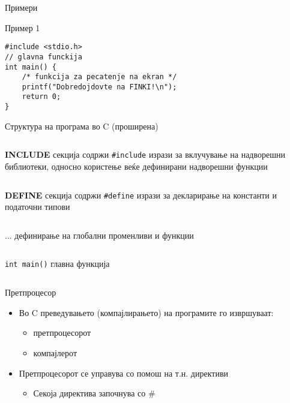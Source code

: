 \begin{frame}[fragile]{Примери}
    \begin{exampleblock}{Пример 1}
\begin{lstlisting}
#include <stdio.h>
// glavna funckija
int main() {
    /* funkcija za pecatenje na ekran */
    printf("Dobredojdovte na FINKI!\n");
    return 0;
}
\end{lstlisting}
    \end{exampleblock}
\end{frame}

\begin{frame}{Структура на програма во C (проширена)}
    \begin{columns}
        \textbf{INCLUDE} секција
         содржи \texttt{\#include} изрази за вклучување на надворешни библиотеки, односно користење веќе дефинирани надворешни функции
    \end{columns}
    \hfill
    \linebreak
    \begin{columns}
        \textbf{DEFINE} секција
         содржи \texttt{\#define} изрази за декларирање на константи и податочни типови
    \end{columns}   
    \hfill
    \linebreak
    \begin{columns}
        ...
         дефинирање на глобални променливи и функции
    \end{columns}
    \hfill
    \linebreak
    \begin{columns}
        \texttt{int main()}
         главна функција
    \end{columns}
\end{frame}

\begin{frame}{Претпроцесор}
\begin{itemize}
    \item Во C преведувањето (компајлирањето) на програмите го извршуваат:
    \begin{itemize}
        \item претпроцесорот
        \item компајлерот
    \end{itemize}
    \item Претпроцесорот се управува со помош на т.н. директиви
    \begin{itemize}
        \item Секоја директива започнува со \#
    \end{itemize}
\end{itemize}
\end{frame}


